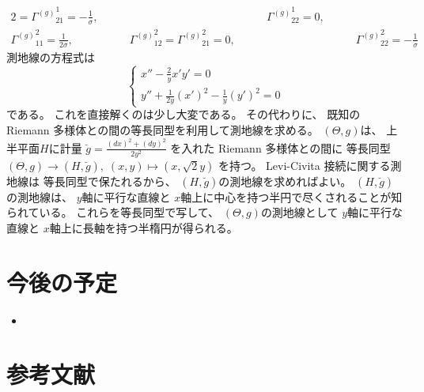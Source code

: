 \documentclass[report]{jlreq}
\begin{document}
\begin{example}[正規分布族]
\begin{alignat}{2}
                    = {\Gamma^{(g)}}_{21}^1
                    = -\frac{1}{\sigma},
            &&\qquad
                {\Gamma^{(g)}}_{22}^1
                    = 0,
            \\
        {\Gamma^{(g)}}_{11}^2
            = \frac{1}{2\sigma},
            &\qquad
                {\Gamma^{(g)}}_{12}^2
                    = {\Gamma^{(g)}}_{21}^2
                    = 0,
            &&\qquad
                {\Gamma^{(g)}}_{22}^2
                    = -\frac{1}{\sigma}
    \end{alignat}
    測地線の方程式は
    \begin{equation}
        \begin{cases}
            x'' - \frac{2}{y} x' y' = 0 \\
            y'' + \frac{1}{2y} (x')^2 - \frac{1}{y} (y')^2 = 0
        \end{cases}
    \end{equation}
    である。
    これを直接解くのは少し大変である。
    その代わりに、
    既知の Riemann 多様体との間の等長同型を利用して測地線を求める。
    $(\Theta, g)$は、
    上半平面$H$に計量
    $\breve{g} = \frac{(dx)^2 + (dy)^2}{2y^2}$
    を入れた Riemann 多様体との間に
    等長同型$(\Theta, g) \to (H, \breve{g}), \;
        (x, y) \mapsto (x, \sqrt{2}y)$
    を持つ。
    Levi-Civita 接続に関する測地線は
    等長同型で保たれるから、
    $(H, \breve{g})$の測地線を求めればよい。
    $(H, \breve{g})$の測地線は、
    $y$軸に平行な直線と
    $x$軸上に中心を持つ半円で尽くされることが知られている。
    これらを等長同型で写して、
    $(\Theta, g)$の測地線として
    $y$軸に平行な直線と
    $x$軸上に長軸を持つ半楕円が得られる。
\end{example}


%
\section*{今後の予定}

\begin{itemize}
    \item \TODO{}
\end{itemize}

%
\section*{参考文献}

\nocite{amari_information_2016}

{
    \renewcommand{\bibsection}{}
    
    
}
\end{document}

